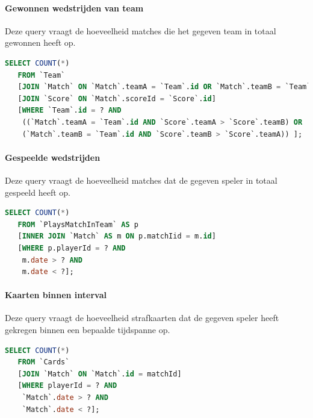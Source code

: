 \documentclass[11pt]{article}
\begin{document}
\paragraph{Gewonnen wedstrijden van team}

  Deze query vraagt de hoeveelheid matches die het gegeven team in totaal gewonnen heeft op.

  \begin{framed}
  \begin{lstlisting}[language=sql]
  SELECT COUNT(*)
   FROM `Team`
   [JOIN `Match` ON `Match`.teamA = `Team`.id OR `Match`.teamB = `Team`.id]
   [JOIN `Score` ON `Match`.scoreId = `Score`.id]
   [WHERE `Team`.id = ? AND
    ((`Match`.teamA = `Team`.id AND `Score`.teamA > `Score`.teamB) OR
    (`Match`.teamB = `Team`.id AND `Score`.teamB > `Score`.teamA)) ];

  \end{lstlisting}
  \end{framed}



\paragraph{Gespeelde wedstrijden}

  Deze query vraagt de hoeveelheid matches dat de gegeven speler in totaal gespeeld heeft op.

  \begin{framed}
  \begin{lstlisting}[language=sql]
  SELECT COUNT(*)
   FROM `PlaysMatchInTeam` AS p
   [INNER JOIN `Match` AS m ON p.matchIid = m.id]
   [WHERE p.playerId = ? AND
    m.date > ? AND
    m.date < ?];

  \end{lstlisting}
  \end{framed}



\paragraph{Kaarten binnen interval}

  Deze query vraagt de hoeveelheid strafkaarten dat de gegeven speler heeft gekregen binnen een bepaalde tijdspanne op.

  \begin{framed}
  \begin{lstlisting}[language=sql]
  SELECT COUNT(*)
   FROM `Cards`
   [JOIN `Match` ON `Match`.id = matchId]
   [WHERE playerId = ? AND
    `Match`.date > ? AND
    `Match`.date < ?];

  \end{lstlisting}
  \end{framed}
\end{document}

